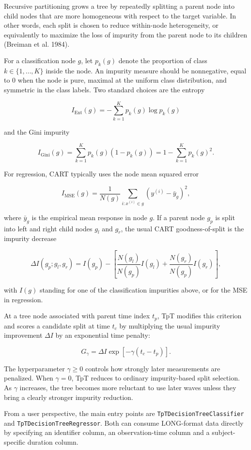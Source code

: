 \documentclass[
]{article}
\begin{document}
Recursive partitioning grows a tree by repeatedly splitting a parent
node into child nodes that are more homogeneous with respect to the
target variable. In other words, each split is chosen to reduce
within-node heterogeneity, or equivalently to maximize the loss of
impurity from the parent node to its children (Breiman et al. 1984).

For a classification node \(g\), let \(p_k(g)\) denote the proportion of
class \(k \in \{1, \ldots, K\}\) inside the node. An impurity measure
should be nonnegative, equal to \(0\) when the node is pure, maximal at
the uniform class distribution, and symmetric in the class labels. Two
standard choices are the entropy

\[
I_{\text{Ent}}(g) = -\sum_{k=1}^{K} p_k(g)\log p_k(g)
\]

and the Gini impurity

\[
I_{\text{Gini}}(g) = \sum_{k=1}^{K} p_k(g)\left(1 - p_k(g)\right)
= 1 - \sum_{k=1}^{K} p_k(g)^2.
\]

For regression, CART typically uses the node mean squared error

\[
I_{\text{MSE}}(g) = \frac{1}{N(g)}
\sum_{i: x^{(i)} \in g} \left(y^{(i)} - \bar y_g\right)^2,
\]

where \(\bar y_g\) is the empirical mean response in node \(g\). If a
parent node \(g_p\) is split into left and right child nodes \(g_l\) and
\(g_r\), the usual CART goodness-of-split is the impurity decrease

\[
\Delta I(g_p; g_l, g_r) =
I(g_p) -
\left[
\frac{N(g_l)}{N(g_p)} I(g_l) +
\frac{N(g_r)}{N(g_p)} I(g_r)
\right],
\]

with \(I(g)\) standing for one of the classification impurities above,
or for the MSE in regression.

At a tree node associated with parent time index \(t_p\), TpT modifies
this criterion and scores a candidate split at time \(t_c\) by
multiplying the usual impurity improvement \(\Delta I\) by an
exponential time penalty:

\[
G_{\gamma} = \Delta I \exp \left[-\gamma (t_c - t_p)\right].
\]

The hyperparameter \(\gamma \ge 0\) controls how strongly later
measurements are penalized. When \(\gamma = 0\), TpT reduces to ordinary
impurity-based split selection. As \(\gamma\) increases, the tree
becomes more reluctant to use later waves unless they bring a clearly
stronger impurity reduction.

From a user perspective, the main entry points are
\texttt{TpTDecisionTreeClassifier} and
\texttt{TpTDecisionTreeRegressor}. Both can consume LONG-format data
directly by specifying an identifier column, an observation-time column
and a subject-specific duration column.
\end{document}
